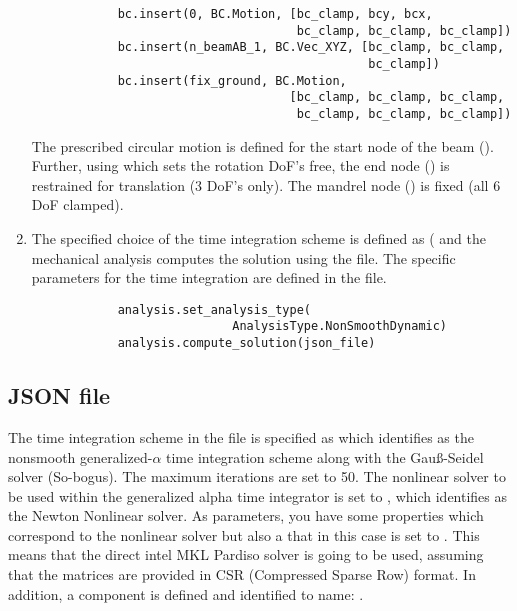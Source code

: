 \begin{enumerate}
\begin{lstlisting}
            bc.insert(0, BC.Motion, [bc_clamp, bcy, bcx, 
                                     bc_clamp, bc_clamp, bc_clamp])
            bc.insert(n_beamAB_1, BC.Vec_XYZ, [bc_clamp, bc_clamp, 
                                               bc_clamp])
            bc.insert(fix_ground, BC.Motion,
                                    [bc_clamp, bc_clamp, bc_clamp, 
                                     bc_clamp, bc_clamp, bc_clamp])
        \end{lstlisting}
    The prescribed circular motion is defined for the start node of the beam (). Further, using  which sets the rotation DoF's free, the end node () is restrained for translation (3 DoF's only). The mandrel node () is fixed (all 6 DoF clamped).        
    \item The specified choice of the time integration scheme is defined as ( and the mechanical analysis computes the solution using the  file. The specific parameters for the time integration are defined in the  file.
        \pythonstyle
        \begin{lstlisting}
            analysis.set_analysis_type(
                            AnalysisType.NonSmoothDynamic)
            analysis.compute_solution(json_file)
        \end{lstlisting}    
\end{enumerate}

\subsection{JSON file}
The time integration scheme in the  file is specified as  which identifies as the nonsmooth generalized-$\alpha$ time integration scheme along with the Gau{\ss}-Seidel solver (So-bogus). The maximum iterations are set to 50. The nonlinear solver to be used within the generalized alpha time integrator is set to , which identifies as the Newton Nonlinear solver. As parameters, you have some properties which correspond to the nonlinear solver but also a  that in this case is set to . This means that the direct intel MKL Pardiso solver is going to be used, assuming that the matrices are provided in CSR (Compressed Sparse Row) format. In addition, a component  is defined and identified to name: .

